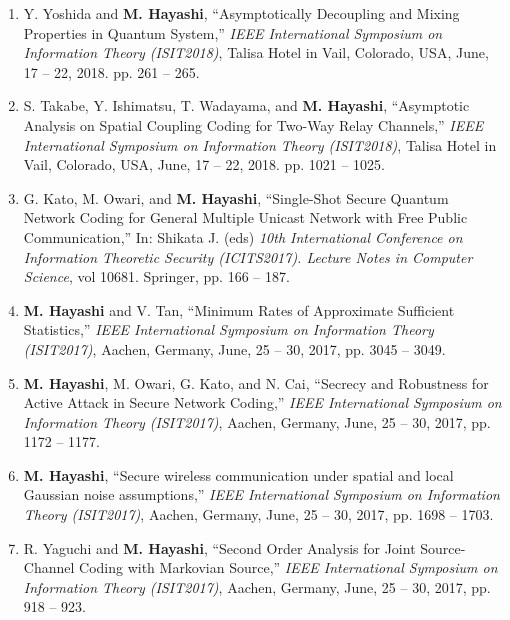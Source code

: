 \documentclass[a4paper,12pt,oneside]{article}
\begin{document}
\begin{enumerate}
    \item
    Y. Yoshida and \textbf{M. Hayashi},
    ``Asymptotically Decoupling and Mixing Properties in Quantum System,''
    {\em IEEE International Symposium on Information Theory (ISIT2018)}, 
     Talisa Hotel in Vail, Colorado, USA, June, 17 -- 22, 2018.
    pp. 261 -- 265.
     
    \item
    S. Takabe,
    Y. Ishimatsu,
    T. Wadayama, and \textbf{M. Hayashi},
    ``Asymptotic Analysis on Spatial Coupling Coding for Two-Way Relay Channels,''
    {\em IEEE International Symposium on Information Theory (ISIT2018)}, 
     Talisa Hotel in Vail, Colorado, USA, June, 17 -- 22, 2018.
    pp. 1021 -- 1025.
    
    
    \item
    G. Kato, M. Owari, and \textbf{M. Hayashi},
    ``Single-Shot Secure Quantum Network Coding
    for General Multiple Unicast Network with Free
    Public Communication,''
    In: Shikata J. (eds) 
    {\em 10th International Conference on Information Theoretic Security (ICITS2017). 
    Lecture Notes in Computer Science},
     vol 10681. Springer,  pp. 166 -- 187.
    
    \item
    \textbf{M. Hayashi} and V. Tan,
    ``Minimum Rates of Approximate Sufficient Statistics,''
    {\em IEEE International Symposium on Information Theory (ISIT2017)}, 
    Aachen, Germany, June, 25 -- 30, 2017, pp. 3045 -- 3049.
    
    \item
    \textbf{M. Hayashi}, M. Owari, G. Kato, and N. Cai,
    ``Secrecy and Robustness for Active Attack in Secure Network Coding,''
    {\em IEEE International Symposium on Information Theory (ISIT2017)}, 
    Aachen, Germany, June, 25 -- 30, 2017, pp. 1172 -- 1177.
    
    \item
    \textbf{M. Hayashi},
    ``Secure wireless communication under spatial and local Gaussian noise assumptions,''
    {\em IEEE International Symposium on Information Theory (ISIT2017)}, 
    Aachen, Germany, June, 25 -- 30, 2017, pp. 1698 -- 1703.
    
    \item
    R. Yaguchi and \textbf{M. Hayashi},
    ``Second Order Analysis for Joint Source-Channel Coding with Markovian Source,''
    {\em IEEE International Symposium on Information Theory (ISIT2017)}, 
    Aachen, Germany, June, 25 -- 30, 2017, pp. 918 -- 923.
    

\end{enumerate}
\end{document}
